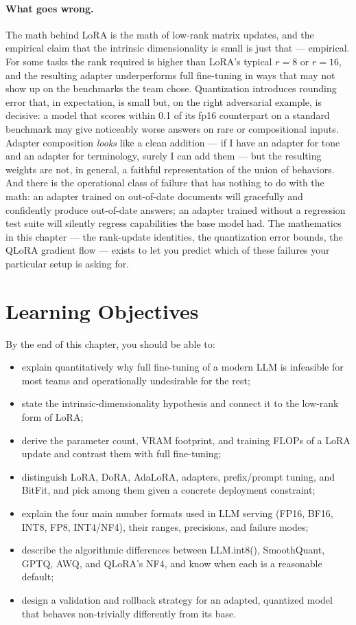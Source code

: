 \paragraph{What goes wrong.}
The math behind LoRA is the math of low-rank matrix updates, and the
empirical claim that the intrinsic dimensionality is small is just
that --- empirical. For some tasks the rank required is higher than
LoRA's typical $r=8$ or $r=16$, and the resulting adapter
underperforms full fine-tuning in ways that may not show up on the
benchmarks the team chose. Quantization introduces rounding error
that, in expectation, is small but, on the right adversarial
example, is decisive: a model that scores within 0.1 of its fp16
counterpart on a standard benchmark may give noticeably worse
answers on rare or compositional inputs. Adapter composition
\emph{looks} like a clean addition --- if I have an adapter for tone
and an adapter for terminology, surely I can add them --- but the
resulting weights are not, in general, a faithful representation of
the union of behaviors. And there is the operational class of
failure that has nothing to do with the math: an adapter trained on
out-of-date documents will gracefully and confidently produce
out-of-date answers; an adapter trained without a regression test
suite will silently regress capabilities the base model had. The
mathematics in this chapter --- the rank-update identities, the
quantization error bounds, the QLoRA gradient flow --- exists to
let you predict which of these failures your particular setup is
asking for.

\section{Learning Objectives}

By the end of this chapter, you should be able to:
\begin{itemize}
  \item explain quantitatively why full fine-tuning of a modern LLM is
        infeasible for most teams and operationally undesirable for the rest;
  \item state the intrinsic-dimensionality hypothesis and connect it to the
        low-rank form of LoRA;
  \item derive the parameter count, VRAM footprint, and training FLOPs of a
        LoRA update and contrast them with full fine-tuning;
  \item distinguish LoRA, DoRA, AdaLoRA, adapters, prefix/prompt tuning, and
        BitFit, and pick among them given a concrete deployment constraint;
  \item explain the four main number formats used in LLM serving (FP16, BF16,
        INT8, FP8, INT4/NF4), their ranges, precisions, and failure modes;
  \item describe the algorithmic differences between LLM.int8(),
        SmoothQuant, GPTQ, AWQ, and QLoRA's NF4, and know when each is a
        reasonable default;
  \item design a validation and rollback strategy for an adapted, quantized
        model that behaves non-trivially differently from its base.
\end{itemize}

